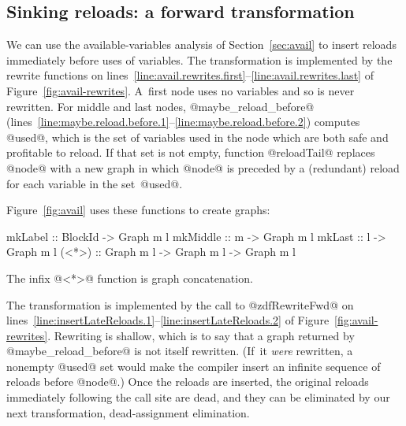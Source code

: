 \documentclass[blockstyle,preprint,nocopyrightspace]{sigplanconf}
\newcommand\linerangeref[2]{\mbox{lines~\ref{line:#1}--\ref{line:#2}}}
\newcommand{\authornote}[1]{{\em #1}}
\def\authornote#1{\unskip\relax}
\newcommand{\simon}[1]{\authornote{SLPJ: #1}}
\def\finalremark#1{\relax}
\newcommand\secref[1]{Section~\ref{sec:#1}}
\newcommand\seclabel[1]{\label{sec:#1}}
\newcommand\figref[1]{Figure~\ref{fig:#1}}
\begin{document}
\subsection{Sinking reloads: a forward transformation}

\finalremark{Incidentally, I wonder if we should
use record notation when constructing @ForwardRewrites@?}

\seclabel{sink-reloads}

We can use the available-variables analysis of \secref{avail} to
insert reloads
immediately before uses of variables.
The transformation is implemented by the rewrite functions on
\linerangeref{avail.rewrites.first}{avail.rewrites.last} of \figref{avail-rewrites}.
A~first node uses no variables and so is never rewritten.
For middle and last nodes, @maybe_reload_before@ 
(\linerangeref{maybe.reload.before.1}{maybe.reload.before.2})
computes @used@, which is the set
of variables used in the node which are both safe and profitable to
reload. 
If that set is not empty, function
@reloadTail@ replaces @node@ with a new graph in which @node@ is
preceded by a (redundant) reload for each variable in the set~@used@.

\figref{avail} uses these functions to create graphs:
\begin{code}
mkLabel  :: BlockId -> Graph m l
mkMiddle :: m       -> Graph m l
mkLast   :: l       -> Graph m l
(<*>)    :: Graph m l -> Graph m l -> Graph m l
\end{code}
The infix @<*>@ function is graph concatenation.

The transformation is implemented by the call to @zdfRewriteFwd@
on \linerangeref{insertLateReloads.1}{insertLateReloads.2} of \figref{avail-rewrites}.
Rewriting is shallow, which is to say that a graph returned by
@maybe_reload_before@ is not itself rewritten.
(If~it \emph{were} rewritten, a nonempty @used@ set would make the
compiler insert an infinite sequence of reloads before @node@.)
Once the reloads are inserted, the original reloads immediately
following the call site are dead, and they can be eliminated by our
next transformation, dead-assignment elimination.
\end{document}
